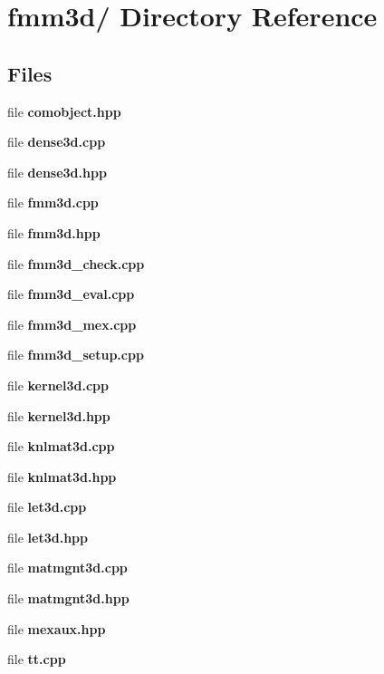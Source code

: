 \section{fmm3d/ Directory Reference}
\label{dir__2Fharper_2Fkifmm3d_2Ffmm3d_2F}


\subsection*{Files}
\begin{CompactItemize}
\item 
file {\bf comobject.hpp}
\item 
file {\bf dense3d.cpp}
\item 
file {\bf dense3d.hpp}
\item 
file {\bf fmm3d.cpp}
\item 
file {\bf fmm3d.hpp}
\item 
file {\bf fmm3d\_\-check.cpp}
\item 
file {\bf fmm3d\_\-eval.cpp}
\item 
file {\bf fmm3d\_\-mex.cpp}
\item 
file {\bf fmm3d\_\-setup.cpp}
\item 
file {\bf kernel3d.cpp}
\item 
file {\bf kernel3d.hpp}
\item 
file {\bf knlmat3d.cpp}
\item 
file {\bf knlmat3d.hpp}
\item 
file {\bf let3d.cpp}
\item 
file {\bf let3d.hpp}
\item 
file {\bf matmgnt3d.cpp}
\item 
file {\bf matmgnt3d.hpp}
\item 
file {\bf mexaux.hpp}
\item 
file {\bf tt.cpp}
\end{CompactItemize}

